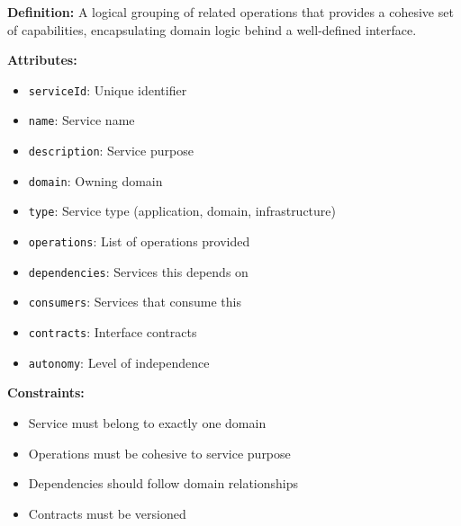 \documentclass[11pt,letterpaper]{article}
\begin{document}
\begin{definitionbox}
\textbf{Definition:} A logical grouping of related operations that provides a cohesive set of capabilities, encapsulating domain logic behind a well-defined interface.

\textbf{Attributes:}
\begin{itemize}[nosep]
    \item \texttt{serviceId}: Unique identifier
    \item \texttt{name}: Service name
    \item \texttt{description}: Service purpose
    \item \texttt{domain}: Owning domain
    \item \texttt{type}: Service type (application, domain, infrastructure)
    \item \texttt{operations}: List of operations provided
    \item \texttt{dependencies}: Services this depends on
    \item \texttt{consumers}: Services that consume this
    \item \texttt{contracts}: Interface contracts
    \item \texttt{autonomy}: Level of independence
\end{itemize}

\textbf{Constraints:}
\begin{itemize}[nosep]
    \item Service must belong to exactly one domain
    \item Operations must be cohesive to service purpose
    \item Dependencies should follow domain relationships
    \item Contracts must be versioned
\end{itemize}
\end{definitionbox}
\end{document}
